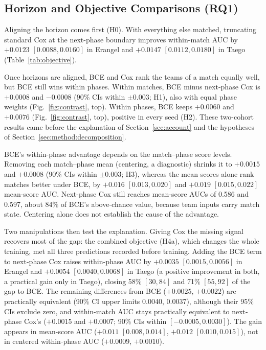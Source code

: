 \documentclass[sigconf,anonymous]{acmart}
\begin{document}
\subsection{Horizon and Objective Comparisons (RQ1)}
\label{sec:results:rq1}

Aligning the horizon comes first (H0). With everything else matched, truncating standard Cox at the next-phase boundary improves within-match AUC by $+0.0123$ $[0.0088,\allowbreak 0.0160]$ in Erangel and $+0.0147$ $[0.0112,\allowbreak 0.0180]$ in Taego (Table~\ref{tab:objective}).

Once horizons are aligned, BCE and Cox rank the teams of a match equally well, but BCE still wins within phases. Within matches, BCE minus next-phase Cox is $+0.0008$ and $-0.0008$ (90\% CIs within $\pm0.003$; H1), also with equal phase weights (Fig.~\ref{fig:contrast}, top). Within phases, BCE keeps $+0.0060$ and $+0.0076$ (Fig.~\ref{fig:contrast}, top), positive in every seed (H2). These two-cohort results came before the explanation of Section~\ref{sec:account} and the hypotheses of Section~\ref{sec:method:decomposition}.

BCE's within-phase advantage depends on the match--phase score levels. Removing each match--phase mean (centering, a diagnostic) shrinks it to $+0.0015$ and $+0.0008$ (90\% CIs within $\pm0.003$; H3), whereas the mean scores alone rank matches better under BCE, by $+0.016$ $[0.013,\allowbreak 0.020]$ and $+0.019$ $[0.015,\allowbreak 0.022]$ mean-score AUC. Next-phase Cox still reaches mean-score AUCs of 0.586 and 0.597, about 84\% of BCE's above-chance value, because team inputs carry match state. Centering alone does not establish the cause of the advantage.

Two manipulations then test the explanation. Giving Cox the missing signal recovers most of the gap: the combined objective (H4a), which changes the whole training, met all three predictions recorded before training. Adding the BCE term to next-phase Cox raises within-phase AUC by $+0.0035$ $[0.0015,\allowbreak 0.0056]$ in Erangel and $+0.0054$ $[0.0040,\allowbreak 0.0068]$ in Taego (a positive improvement in both, a practical gain only in Taego), closing 58\% $[30,\allowbreak 84]$ and 71\% $[55,\allowbreak 92]$ of the gap to BCE. The remaining differences from BCE ($+0.0025$, $+0.0022$) are practically equivalent (90\% CI upper limits 0.0040, 0.0037), although their 95\% CIs exclude zero, and within-match AUC stays practically equivalent to next-phase Cox's ($+0.0015$ and $+0.0007$; 90\% CIs within $[-0.0005,\allowbreak 0.0030]$). The gain appears in mean-score AUC ($+0.011$ $[0.008,\allowbreak 0.014]$, $+0.012$ $[0.010,\allowbreak 0.015]$), not in centered within-phase AUC ($+0.0009$, $+0.0010$).
\end{document}
